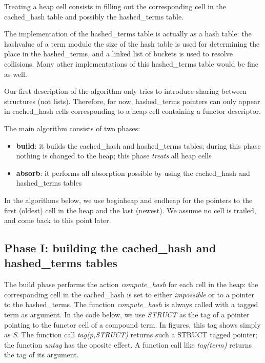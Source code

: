 \documentclass{tlp}
\begin{document}
Treating a heap cell consists in filling out the corresponding cell in
the cached\_hash table and possibly the hashed\_terms table.

The implementation of the hashed\_terms table is actually as a hash
table: the hashvalue of a term modulo the size of the hash table is
used for determining the place in the hashed\_terms, and a linked list
of buckets is used to resolve collisions. Many other implementations
of this hashed\_terms table would be fine as well.

Our first description of the algorithm only tries to introduce sharing
between structures (not lists). Therefore, for now, hashed\_terms pointers
can only appear in cached\_hash cells corresponding to a heap cell
containing a functor descriptor.

The main algorithm consists of two phases:
\begin{itemize}
\item 
{\bf build}: it builds the cached\_hash and hashed\_terms tables;
during this phase nothing is changed to the heap; this phase {\em
treats} all heap cells
\item 
{\bf absorb}: it performs all absorption possible by using the cached\_hash
and hashed\_terms tables
\end{itemize}

In the algorithms below, we use beginheap and endheap for the pointers
to the first (oldest) cell in the heap and the last (newest). We
assume no cell is trailed, and come back to this point later.


\subsection{Phase I: building the cached\_hash and hashed\_terms tables}\label{fase1}

\begin{sloppypar}
The build phase performs the action {\em compute\_hash} for each cell
in the heap: the corresponding cell in the cached\_hash is set to
either {\em impossible} or to a pointer to the hashed\_terms. The
function {\em compute\_hash} is always called with a tagged term as
argument. In the code below, we use {\em STRUCT} as the tag of a
pointer pointing to the functor cell of a compound term. In figures,
this tag shows simply as {\em S}. The function call {\em
tag(p,STRUCT)} returns such a STRUCT tagged pointer; the function {\em
untag} has the oposite effect. A function call like {\em tag(term)}
returns the tag of its argument.
\end{sloppypar}
\end{document}
